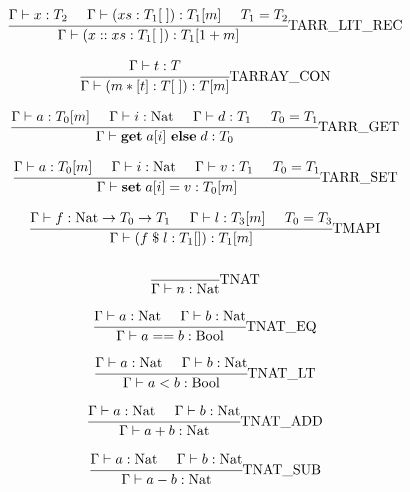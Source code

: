 \documentclass{article}
\begin{document}
\begin{equation}
\cfrac
{\Gamma \vdash x : T_2 \;\;\;\;\; \Gamma \vdash (xs : T_1[\;]) : T_1[m] \;\;\;\;\; T_1 = T_2}
{\Gamma \vdash (x::xs : T_1[\;]) : T_1[1+m] }\text{TARR\_LIT\_REC}
\end{equation}

\begin{equation}
\cfrac
{\Gamma \vdash t : T}
{\Gamma \vdash (m * [t] : T[\;]) : T[m]}\text{TARRAY\_CON}
\end{equation}

\begin{equation}
\cfrac
{\Gamma \vdash a : T_0[m] \;\;\;\;\; \Gamma \vdash i : \text{Nat} \;\;\;\;\; \Gamma \vdash d : T_1 \;\;\;\;\; T_0 = T_1}
{\Gamma \vdash \textbf{get}\; a[i]\ \textbf{else}\; d : T_0}\text{TARR\_GET}
\end{equation}

\begin{equation}
\cfrac
{\Gamma \vdash a : T_0[m] \;\;\;\;\; \Gamma \vdash i : \text{Nat} \;\;\;\;\; \Gamma \vdash v : T_1 \;\;\;\;\; T_0 = T_1}
{\Gamma \vdash \textbf{set}\; a[i]=v : T_0[m]}\text{TARR\_SET}
\end{equation}

\begin{equation}
\cfrac
{\Gamma \vdash f : \text{Nat} \rightarrow T_0 \rightarrow T_1 \;\;\;\;\; \Gamma \vdash l : T_3[m]  \;\;\;\;\; T_0 = T_3}
{\Gamma \vdash (f\; \$\; l : T_1[]) : T_1[m]}\text{TMAPI}
\end{equation}

\begin{equation}
\cfrac
{}
{\Gamma \vdash n : \text{Nat}}\text{TNAT}
\end{equation}

\begin{equation}
\cfrac
{\Gamma \vdash a : \text{Nat}  \;\;\;\;\; \Gamma \vdash b : \text{Nat}}
{\Gamma \vdash a == b : \text{Bool}}\text{TNAT\_EQ}
\end{equation}

\begin{equation}
\cfrac
{\Gamma \vdash a : \text{Nat}  \;\;\;\;\; \Gamma \vdash b : \text{Nat}}
{\Gamma \vdash a < b : \text{Bool}}\text{TNAT\_LT}
\end{equation}

\begin{equation}
\cfrac
{\Gamma \vdash a : \text{Nat}  \;\;\;\;\; \Gamma \vdash b : \text{Nat}}
{\Gamma \vdash a + b : \text{Nat}}\text{TNAT\_ADD}
\end{equation}

\begin{equation}
\cfrac
{\Gamma \vdash a : \text{Nat}  \;\;\;\;\; \Gamma \vdash b : \text{Nat}}
{\Gamma \vdash a - b : \text{Nat}}\text{TNAT\_SUB}
\end{equation}
\end{document}
